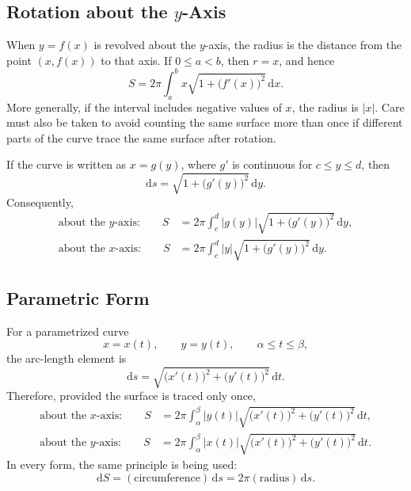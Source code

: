 \subsection{Rotation about the \(y\)-Axis}

When \(y=f(x)\) is revolved about the \(y\)-axis, the radius is the distance
from the point \((x,f(x))\) to that axis.  If \(0\leq a<b\), then \(r=x\),
and hence
\[
    S=2\pi\int_a^b
    x\sqrt{1+\bigl(f'(x)\bigr)^2}\,\mathrm{d}x.
\]
More generally, if the interval includes negative values of \(x\), the
radius is \(\lvert x\rvert\).  Care must also be taken to avoid counting the
same surface more than once if different parts of the curve trace the same
surface after rotation.

If the curve is written as \(x=g(y)\), where \(g'\) is continuous for
\(c\leq y\leq d\), then
\[
    \mathrm{d}s=\sqrt{1+\bigl(g'(y)\bigr)^2}\,\mathrm{d}y.
\]
Consequently,
\[
    \begin{aligned}
        \text{about the \(y\)-axis:}\qquad
        S&=2\pi\int_c^d
        \lvert g(y)\rvert\sqrt{1+\bigl(g'(y)\bigr)^2}\,\mathrm{d}y,\\
        \text{about the \(x\)-axis:}\qquad
        S&=2\pi\int_c^d
        \lvert y\rvert\sqrt{1+\bigl(g'(y)\bigr)^2}\,\mathrm{d}y.
    \end{aligned}
\]

\subsection{Parametric Form}

For a parametrized curve
\[
    x=x(t),\qquad y=y(t),\qquad \alpha\leq t\leq\beta,
\]
the arc-length element is
\[
    \mathrm{d}s
    =\sqrt{\bigl(x'(t)\bigr)^2+\bigl(y'(t)\bigr)^2}\,\mathrm{d}t.
\]
Therefore, provided the surface is traced only once,
\[
    \begin{aligned}
        \text{about the \(x\)-axis:}\qquad
        S&=2\pi\int_\alpha^\beta
        \lvert y(t)\rvert
        \sqrt{\bigl(x'(t)\bigr)^2+\bigl(y'(t)\bigr)^2}\,\mathrm{d}t,\\
        \text{about the \(y\)-axis:}\qquad
        S&=2\pi\int_\alpha^\beta
        \lvert x(t)\rvert
        \sqrt{\bigl(x'(t)\bigr)^2+\bigl(y'(t)\bigr)^2}\,\mathrm{d}t.
    \end{aligned}
\]
In every form, the same principle is being used:
\[
    \boxed{\mathrm{d}S=(\text{circumference})\,\mathrm{d}s
    =2\pi(\text{radius})\,\mathrm{d}s.}
\]

